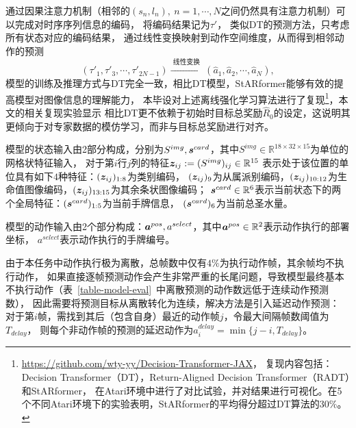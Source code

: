 通过因果注意力机制（相邻的$(s_n,l_n),~n=1,\cdots,N$之间仍然具有注意力机制）可以完成对时序序列信息的编码，
将编码结果记为$\tau'$，
类似DT的预测方法，只考虑所有状态对应的编码结果，
通过线性变换映射到动作空间维度，从而得到相邻动作的预测
\begin{equation}
  (\tau'_1,\tau'_3,\cdots, \tau'_{2N-1})\xrightarrow{\text{~线性变换~}}
  (\hat{a}_1,\hat{a}_2,\cdots, \hat{a}_{N}),
\end{equation}
模型的训练及推理方式与DT完全一致，相比DT模型，StARformer能够有效的提高模型对图像信息的理解能力，
本毕设对上述离线强化学习算法进行了复现\footnote{\url{https://github.com/wty-yy/Decision-Transformer-JAX}，
复现内容包括：Decision Transformer（DT），Return-Aligned Decision Transformer（RADT）和StARformer，
在Atari环境中进行了对比试验，并对结果进行可视化。在5个不同Atari环境下的实验表明，StARformer的平均得分超过DT算法的$30\%$。}，本文的相关复现实验显示
相比DT更不依赖于初始时目标总奖励$\hat{R}_0$的设定，这说明其更倾向于对专家数据的模仿学习，而非与目标总奖励进行对齐。

模型的状态输入由2部分构成，分别为$S^{img}, \boldsymbol{s}^{card}$，其中$S^{img}\in\mathbb{R}^{18\times 32\times 15}$为单位的网格状特征输入，
对于第$i$行$j$列的特征$\boldsymbol{z}_{ij}:=(S^{img})_{ij}\in\mathbb{R}^{15}$
表示处于该位置的单位具有如下$4$种特征：$(\boldsymbol{z}_{ij})_{1:8}$为类别编码，
$(\boldsymbol{z}_{ij})_9$为从属派别编码，$(\boldsymbol{z}_{ij})_{10:12}$为生命值图像编码，$(\boldsymbol{z}_{ij})_{13:15}$为其余条状图像编码；
$\boldsymbol{s}^{card}\in\mathbb{R}^6$表示当前状态下的两个全局特征：$(\boldsymbol{s}^{card})_{1:5}$为当前手牌信息，
$(\boldsymbol{s}^{card})_6$为当前总圣水量。

模型的动作输入由2个部分构成：$\boldsymbol{a}^{pos}, a^{select}$，其中$\boldsymbol{a}^{pos}\in\mathbb{R}^2$表示动作执行的部署坐标，
$a^{select}$表示动作执行的手牌编号。

\label{sec-target}
由于本任务中动作执行极为离散，总帧数中仅有$4\%$为执行动作帧，其余帧均不执行动作，
如果直接逐帧预测动作会产生非常严重的长尾问题，导致模型最终基本不执行动作（表~\ref{table-model-eval}~中离散预测的动作数远低于连续动作预测数），
因此需要将预测目标从离散转化为连续，解决方法是引入延迟动作预测：
对于第$i$帧，需找到其后（包含自身）最近的动作帧$j$，令最大间隔帧数阈值为$T_{delay}$，
则每个非动作帧的预测的延迟动作为$a^{delay}_{i} = \min\{j-i, T_{delay}\}$。

